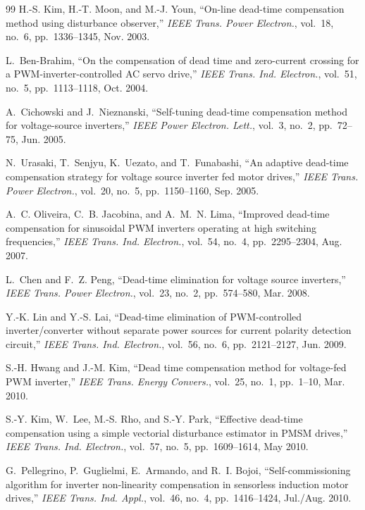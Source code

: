\documentclass[11pt,a4paper]{article}
\begin{document}
\begin{thebibliography}{99}
H.-S. Kim, H.-T. Moon, and M.-J. Youn, ``On-line dead-time compensation method using
disturbance observer,'' \emph{IEEE Trans. Power Electron.}, vol.~18, no.~6,
pp.~1336--1345, Nov. 2003.

L.~Ben-Brahim, ``On the compensation of dead time and zero-current crossing for a
PWM-inverter-controlled AC servo drive,'' \emph{IEEE Trans. Ind. Electron.}, vol.~51,
no.~5, pp.~1113--1118, Oct. 2004.

A.~Cichowski and J.~Nieznanski, ``Self-tuning dead-time compensation method for
voltage-source inverters,'' \emph{IEEE Power Electron. Lett.}, vol.~3, no.~2,
pp.~72--75, Jun. 2005.

N.~Urasaki, T.~Senjyu, K.~Uezato, and T.~Funabashi, ``An adaptive dead-time compensation
strategy for voltage source inverter fed motor drives,'' \emph{IEEE Trans. Power
Electron.}, vol.~20, no.~5, pp.~1150--1160, Sep. 2005.

A.~C. Oliveira, C.~B. Jacobina, and A.~M.~N. Lima, ``Improved dead-time compensation for
sinusoidal PWM inverters operating at high switching frequencies,'' \emph{IEEE Trans.
Ind. Electron.}, vol.~54, no.~4, pp.~2295--2304, Aug. 2007.

L.~Chen and F.~Z. Peng, ``Dead-time elimination for voltage source inverters,''
\emph{IEEE Trans. Power Electron.}, vol.~23, no.~2, pp.~574--580, Mar. 2008.

Y.-K. Lin and Y.-S. Lai, ``Dead-time elimination of PWM-controlled inverter/converter
without separate power sources for current polarity detection circuit,'' \emph{IEEE
Trans. Ind. Electron.}, vol.~56, no.~6, pp.~2121--2127, Jun. 2009.

S.-H. Hwang and J.-M. Kim, ``Dead time compensation method for voltage-fed PWM
inverter,'' \emph{IEEE Trans. Energy Convers.}, vol.~25, no.~1, pp.~1--10, Mar. 2010.

S.-Y. Kim, W.~Lee, M.-S. Rho, and S.-Y. Park, ``Effective dead-time compensation using a
simple vectorial disturbance estimator in PMSM drives,'' \emph{IEEE Trans. Ind.
Electron.}, vol.~57, no.~5, pp.~1609--1614, May 2010.

G.~Pellegrino, P.~Guglielmi, E.~Armando, and R.~I. Bojoi, ``Self-commissioning algorithm
for inverter non-linearity compensation in sensorless induction motor drives,''
\emph{IEEE Trans. Ind. Appl.}, vol.~46, no.~4, pp.~1416--1424, Jul./Aug. 2010.


\end{thebibliography}
\end{document}
